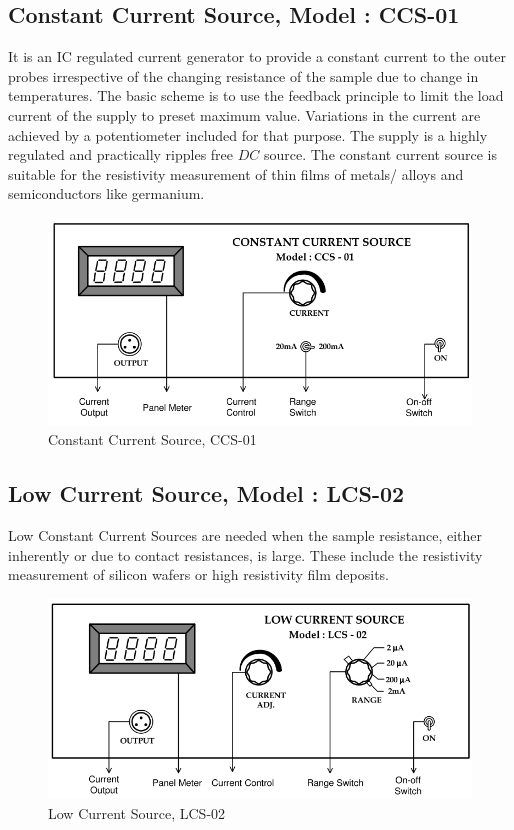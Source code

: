 \documentclass[%
 aip,
 amsmath,amssymb,
 reprint,%
]{revtex4-1}
\begin{document}
\subsection{Constant Current Source, Model : CCS-01}
It is an IC regulated current generator to provide a constant current to the
outer probes irrespective of the changing resistance of the sample due to change in
temperatures. The basic scheme is to use the feedback principle to limit the load
current of the supply to preset maximum value. Variations in the current are
achieved by a potentiometer included for that purpose. The supply is a highly
regulated and practically ripples free $DC$ source. The constant current source is
suitable for the resistivity measurement of thin films of metals/ alloys and
semiconductors like germanium.
\begin{figure}
    \centering
    \includegraphics[scale = 0.8]{Figures/ccs-01.png}
    \caption{Constant Current Source, CCS-01}
    \label{fig:ccs-01}
\end{figure}

\subsection{Low Current Source, Model : LCS-02}
Low Constant Current Sources are needed when the sample resistance, either
inherently or due to contact resistances, is large. These include the resistivity
measurement of silicon wafers or high resistivity film deposits.

\begin{figure}
    \centering
    \includegraphics[scale = 0.8]{Figures/lcs-02.png}
    \caption{Low Current Source, LCS-02}
    \label{fig:lcs-02}
\end{figure}
\end{document}
